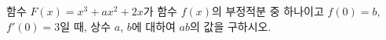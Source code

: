 함수 $F(x)=x^3+ax^2+2x$가 함수 $f(x)$의 부정적분 중 하나이고 $f(0)=b$, $f'(0)=3$일 때, 상수 $a$, $b$에 대하여 $ab$의 값을 구하시오.
